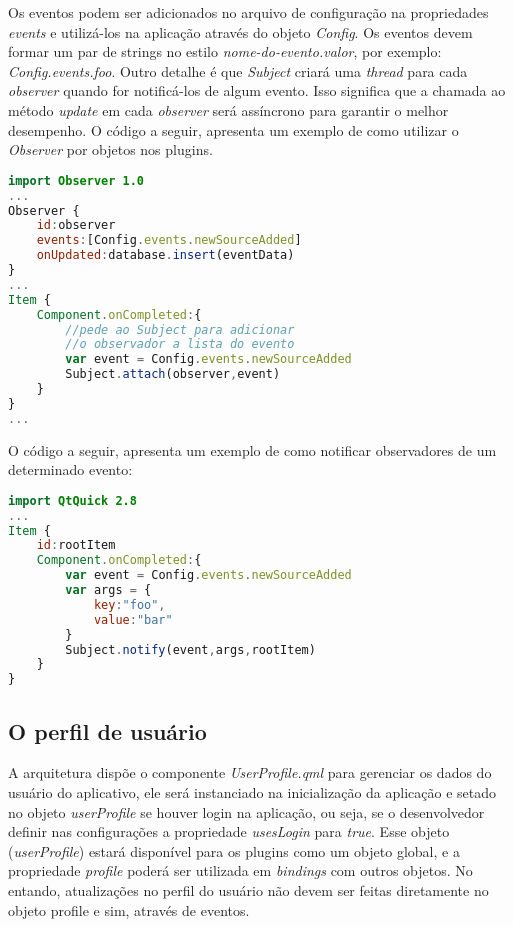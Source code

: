 Os eventos podem ser adicionados no arquivo de configuração na propriedades \textit{events} e utilizá-los na aplicação através do objeto \textit{Config}. Os eventos devem formar um par de strings no estilo \textit{nome-do-evento.valor}, por exemplo: \textit{Config.events.foo}. Outro detalhe é que \textit{Subject} criará uma \textit{thread} para cada \textit{observer} quando for notificá-los de algum evento. Isso significa que a chamada ao método \textit{update} em cada \textit{observer} será assíncrono para garantir o melhor desempenho. O código a seguir, apresenta um exemplo de como utilizar o \textit{Observer} por objetos nos plugins.

\begin{center}
\begin{lstlisting}[language=qml]
import Observer 1.0
...
Observer {
	id:observer
	events:[Config.events.newSourceAdded]
	onUpdated:database.insert(eventData)
}
...
Item {
	Component.onCompleted:{
		//pede ao Subject para adicionar
		//o observador a lista do evento
		var event = Config.events.newSourceAdded
		Subject.attach(observer,event)
	}
}
...
\end{lstlisting}
\end{center}

O código a seguir, apresenta um exemplo de como notificar observadores de um determinado evento:

\begin{center}
\begin{lstlisting}[language=qml]
import QtQuick 2.8
...
Item {
	id:rootItem
	Component.onCompleted:{
		var event = Config.events.newSourceAdded
		var args = {
			key:"foo",
			value:"bar"
		}
		Subject.notify(event,args,rootItem)
	}
}
\end{lstlisting}
\end{center}


\subsection{O perfil de usuário}\label{sec:solucao-desenvolvida}
A arquitetura dispõe o componente \textit{UserProfile.qml} para gerenciar os dados do usuário do aplicativo, ele será instanciado na inicialização da aplicação e setado no objeto \textit{userProfile} se houver login na aplicação, ou seja, se o desenvolvedor definir nas configurações a propriedade \textit{usesLogin} para \textit{true}. Esse objeto (\textit{userProfile}) estará disponível para os plugins como um objeto global, e a propriedade \textit{profile} poderá ser utilizada em \textit{bindings} com outros objetos. No entando, atualizações no perfil do usuário não devem ser feitas diretamente no objeto profile e sim, através de eventos.\par

